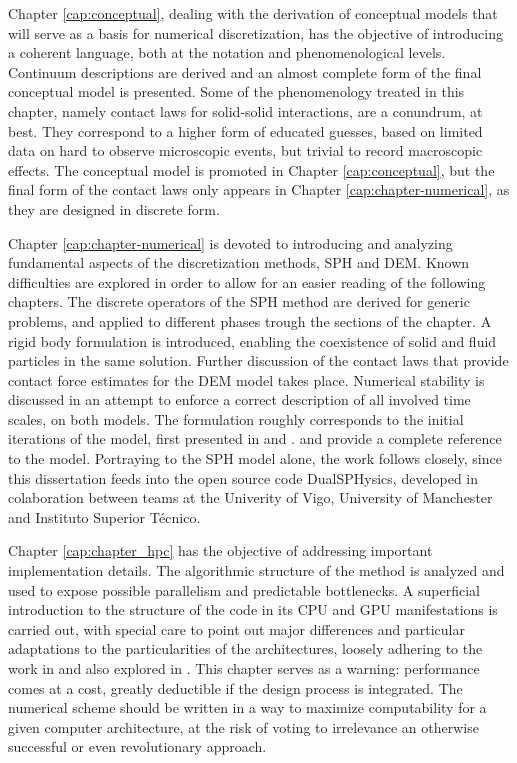 Chapter \ref{cap:conceptual}, dealing with the derivation of conceptual models that will serve as a basis for numerical discretization, has the objective of introducing a coherent language, both at the notation and phenomenological levels. Continuum descriptions are derived and an almost complete form of the final conceptual model is presented. Some of the phenomenology treated in this chapter, namely contact laws for solid-solid interactions, are a conundrum, at best. They correspond to a higher form of educated guesses, based on limited data on hard to observe microscopic events, but trivial to record macroscopic effects. The conceptual model is promoted in Chapter  \ref{cap:conceptual}, but the final form of the contact laws only appears in Chapter \ref{cap:chapter-numerical}, as they are designed in discrete form.

Chapter \ref{cap:chapter-numerical} is devoted to introducing and analyzing fundamental aspects of the discretization methods, \ac{SPH} and \ac{DEM}. Known difficulties are explored in order to allow for an easier reading of the following chapters. The discrete operators of the \ac{SPH} method are derived for generic problems, and applied to different phases trough the sections of the chapter. A rigid body formulation is introduced, enabling the coexistence of solid and fluid particles in the same solution. Further discussion of the contact laws that provide contact force estimates for the \ac{DEM} model takes place. Numerical stability is discussed in an attempt to enforce a correct description of all involved time scales, on both models. The formulation roughly corresponds to the initial iterations of the model, first presented in \cite{Canelas-al-2013b} and \cite{Canelas-al-2013c}. \cite{Canelas-al-2015a} and \cite{Canelas-al-2015b} provide a complete reference to the model. Portraying to the \ac{SPH} model alone, the work follows \cite{Crespo-2015} closely, since this dissertation feeds into the open source code DualSPHysics, developed in colaboration between teams at the Univerity of Vigo, University of Manchester and Instituto Superior T\'{e}cnico.

Chapter \ref{cap:chapter_hpc} has the objective of addressing important implementation details. The algorithmic structure of the method is analyzed and used to expose possible parallelism and predictable bottlenecks. A superficial introduction to the structure of the code in its \ac{CPU} and \ac{GPU} manifestations is carried out, with special care to point out major differences and particular adaptations to the particularities of the architectures, loosely adhering to the work in \cite{Canelas-al-2013b} and also explored in \cite{Crespo-2015}. This chapter serves as a warning: performance comes at a cost, greatly deductible if the design process is integrated. The numerical scheme should be written in a way to maximize computability for a given computer architecture, at the risk of voting to irrelevance an otherwise successful or even revolutionary approach.

